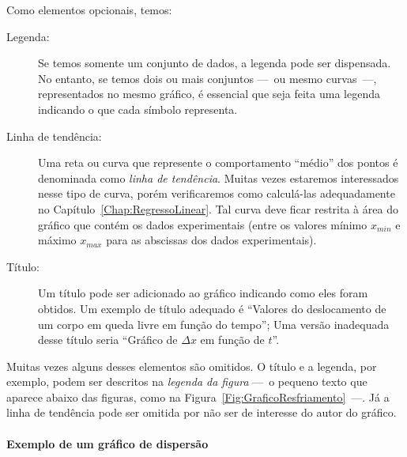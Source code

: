 \noindent{}Como elementos opcionais, temos:
\begin{description}
	\item[Legenda:] Se temos somente um conjunto de dados, a legenda pode ser dispensada. No entanto, se temos dois ou mais conjuntos ---~ou mesmo curvas~---, representados no mesmo gráfico, é essencial que seja feita uma legenda indicando o que cada símbolo representa.
	\item[Linha de tendência:] Uma reta ou curva que represente o comportamento ``médio'' dos pontos é denominada como \emph{linha de tendência}. Muitas vezes estaremos interessados nesse tipo de curva, porém verificaremos como calculá-las adequadamente no Capítulo~\ref{Chap:RegressoLinear}. Tal curva deve ficar restrita à área do gráfico que contém os dados experimentais (entre os valores mínimo $x_{min}$ e máximo $x_{max}$ para as abscissas dos dados experimentais).
	\item[Título:] Um título pode ser adicionado ao gráfico indicando como eles foram obtidos. Um exemplo de título adequado é ``Valores do deslocamento de um corpo em queda livre em função do tempo''; Uma versão inadequada desse título seria ``Gráfico de $\Delta x$ em função de $t$''.
\end{description}
%
Muitas vezes alguns desses elementos são omitidos. O título e a legenda, por exemplo, podem ser descritos na \emph{legenda da figura} ---~o pequeno texto que aparece abaixo das figuras, como na Figura~\ref{Fig:GraficoResfriamento}~---. Já a linha de tendência pode ser omitida por não ser de interesse do autor do gráfico.

\paragraph{Exemplo de um gráfico de dispersão}

